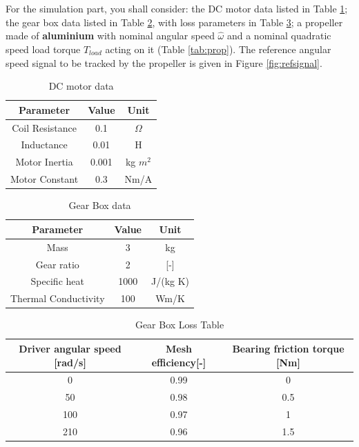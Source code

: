\documentclass[11pt,a4paper,oneside]{article}
\begin{document}
For the simulation part, you shall consider: the DC motor data listed in Table \ref{tab:dc}; the gear box data listed in Table \ref{tab:gear}, with loss parameters in Table \ref{tab:gear2}; a propeller made of \textbf{aluminium} with nominal angular speed $\hat{\omega}$ and a nominal quadratic speed load torque $\hat{T}_{load}$ acting on it (Table \ref{tab:prop}).
The reference angular speed signal to be tracked by the propeller is given in Figure \ref{fig:refsignal}. 

\begin{table}[ht!]
    \centering
    \caption{DC motor data}
    \begin{tabular}{ |c|c|c| } 
        \hline
        \textbf{Parameter} & \textbf{Value} & \textbf{Unit}\\
        \hline
        Coil Resistance & 0.1 & $\Omega$  \\ 
        Inductance & 0.01 & H  \\ 
        Motor Inertia & 0.001 & kg $m^2$  \\ 
        Motor Constant & 0.3 & Nm/A \\ 
        \hline
    \end{tabular}
    \label{tab:dc}
\end{table}

\begin{table}[ht!]
    \centering
    \caption{Gear Box data}
    \begin{tabular}{ |c|c|c| } 
        \hline
        \textbf{Parameter} & \textbf{Value} & \textbf{Unit}\\
        \hline
        Mass & 3 & kg  \\ 
        Gear ratio & 2 & [-]  \\ 
        Specific heat & 1000 & J/(kg K)   \\ 
        Thermal Conductivity & 100 & Wm/K \\ 
        \hline
    \end{tabular}
    \label{tab:gear}
\end{table}
        
\begin{table}[ht!]
    \centering
    \caption{Gear Box Loss Table}
    \begin{tabular}{ |c|c|c| } 
        \hline
        \textbf{Driver angular speed [rad/s]} & \textbf{Mesh efficiency[-]} & \textbf{Bearing friction torque [Nm]}\\
        \hline
        0 & 0.99 & 0  \\ 
        50 & 0.98 & 0.5  \\ 
        100 & 0.97 & 1  \\ 
        210 & 0.96 & 1.5  \\ 
        \hline
    \end{tabular}
    \label{tab:gear2}
\end{table}
\end{document}
